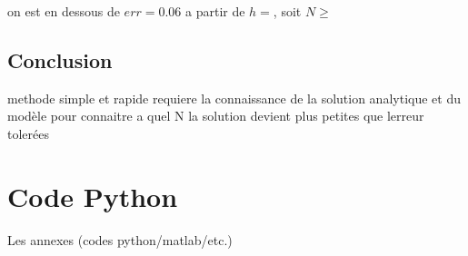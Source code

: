 \documentclass[a4paper,10pt]{report} %
\begin{document}
on est en dessous de $err=0.06$ a partir de $h=$, soit $N \geq $
\section{Conclusion}

methode simple et rapide
requiere la connaissance de la solution analytique et du modèle pour connaitre a quel N la solution devient plus petites que lerreur tolerées

%
%	

\appendix 
\chapter{Code Python}

Les annexes (codes python/matlab/etc.)
\end{document}
